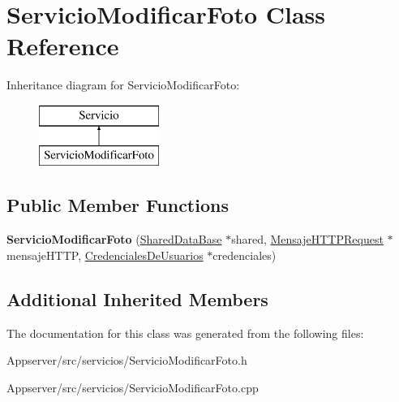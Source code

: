 \hypertarget{classServicioModificarFoto}{}\section{Servicio\+Modificar\+Foto Class Reference}
\label{classServicioModificarFoto}
Inheritance diagram for Servicio\+Modificar\+Foto\+:\begin{figure}[H]
\begin{center}
\leavevmode
\includegraphics[height=2.000000cm]{classServicioModificarFoto}
\end{center}
\end{figure}
\subsection*{Public Member Functions}
\begin{DoxyCompactItemize}
\item 
{\bfseries Servicio\+Modificar\+Foto} (\hyperlink{classSharedDataBase}{Shared\+Data\+Base} $\ast$shared, \hyperlink{classMensajeHTTPRequest}{Mensaje\+H\+T\+T\+P\+Request} $\ast$mensaje\+H\+T\+TP, \hyperlink{classCredencialesDeUsuarios}{Credenciales\+De\+Usuarios} $\ast$credenciales)\hypertarget{classServicioModificarFoto_a637a87caffbe8011613ca778b0480521}{}\label{classServicioModificarFoto_a637a87caffbe8011613ca778b0480521}

\end{DoxyCompactItemize}
\subsection*{Additional Inherited Members}


The documentation for this class was generated from the following files\+:\begin{DoxyCompactItemize}
\item 
Appserver/src/servicios/Servicio\+Modificar\+Foto.\+h\item 
Appserver/src/servicios/Servicio\+Modificar\+Foto.\+cpp\end{DoxyCompactItemize}
